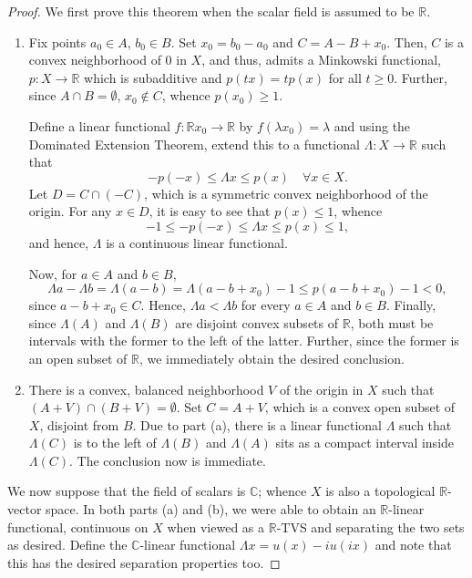 \documentclass[12pt]{article}
\theoremstyle{thmstyle}
\theoremstyle{defstyle}
\newcommand{\R}{\mathbb{R}}
\newcommand{\bbC}{\mathbb{C}}
\renewcommand{\le}{\leqslant}
\renewcommand{\ge}{\geqslant}
\begin{document}
\begin{proof}
    We first prove this theorem when the scalar field is assumed to be $\R$.
\begin{enumerate}[label=(\alph*)]
    \item Fix points $a_0\in A$, $b_0\in B$. Set $x_0 = b_0 - a_0$ and $C = A - B + x_0$. Then, $C$ is a convex neighborhood of $0$ in $X$, and thus, admits a Minkowski functional, $p: X\to\R$ which is subadditive and $p(tx) = tp(x)$ for all $t\ge 0$.
    Further, since $A\cap B = \emptyset$, $x_0\notin C$, whence $p(x_0)\ge 1$.

    Define a linear functional $f: \R x_0\to\R$ by $f(\lambda x_0) = \lambda$ and using the Dominated Extension Theorem, extend this to a functional $\Lambda: X\to\R$ such that 
    \begin{equation*}
        -p(-x)\le \Lambda x\le p(x)\quad\forall x\in X.
    \end{equation*}
    Let $D = C\cap (-C)$, which is a symmetric convex neighborhood of the origin. For any $x\in D$, it is easy to see that $p(x)\le 1$, whence 
    \begin{equation*}
        -1\le -p(-x)\le\Lambda x\le p(x)\le 1,
    \end{equation*}
    and hence, $\Lambda$ is a continuous linear functional.

    Now, for $a\in A$ and $b\in B$, 
    \begin{equation*}
        \Lambda a - \Lambda b = \Lambda(a - b) = \Lambda(a - b + x_0) - 1 \le p(a - b + x_0) - 1 < 0,
    \end{equation*}
    since $a - b + x_0\in C$. Hence, $\Lambda a < \Lambda b$ for every $a\in A$ and $b\in B$. Finally, since $\Lambda(A)$ and $\Lambda(B)$ are disjoint convex subsets of $\R$, both must be intervals with the former to the left of the latter. Further, since the former is an open subset of $\R$, we immediately obtain the desired conclusion.

    \item There is a convex, balanced neighborhood $V$ of the origin in $X$ such that $(A + V)\cap (B + V) = \emptyset$. Set $C = A + V$, which is a convex open subset of $X$, disjoint from $B$. Due to part (a), there is a linear functional $\Lambda$ such that $\Lambda(C)$ is to the left of $\Lambda(B)$ and $\Lambda(A)$ sits as a compact interval inside $\Lambda(C)$. The conclusion now is immediate.
\end{enumerate}

We now suppose that the field of scalars is $\bbC$; whence $X$ is also a topological $\R$-vector space. In both parts (a) and (b), we were able to obtain an $\R$-linear functional, continuous on $X$ when viewed as a $\R$-TVS and separating the two sets as desired. Define the $\bbC$-linear functional $\Lambda x = u(x) - iu(ix)$ and note that this has the desired separation properties too.
\end{proof}
\end{document}
